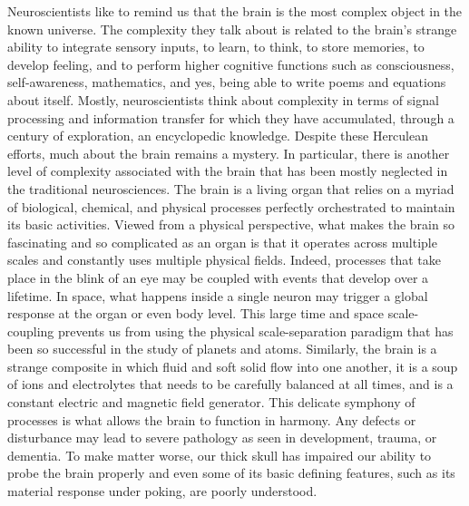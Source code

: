 %
%

\foreword

\setcounter{page}{7}




Neuroscientists like to remind us that the brain is the most complex
object in the known universe. The complexity they talk about is
related to the brain's strange ability to integrate sensory inputs, to
learn, to think, to store memories, to develop feeling, and to perform
higher cognitive functions such as consciousness, self-awareness,
mathematics, and yes, being able to write poems and equations about
itself. Mostly, neuroscientists think about complexity in terms of
signal processing and information transfer for which they have
accumulated, through a century of exploration, an encyclopedic
knowledge. Despite these Herculean efforts, much about the brain
remains a mystery. In particular, there is another level of complexity
associated with the brain that has been mostly neglected in the
traditional neurosciences. The brain is a living organ that relies on
a myriad of biological, chemical, and physical processes perfectly
orchestrated to maintain its basic activities. Viewed from a physical
perspective, what makes the brain so fascinating and so complicated as
an organ is that it operates across multiple scales and constantly
uses multiple physical fields. Indeed, processes that take place in
the blink of an eye may be coupled with events that develop over a
lifetime. In space, what happens inside a single neuron may trigger a
global response at the organ or even body level. This large time and
space scale-coupling prevents us from using the physical
scale-separation paradigm that has been so successful in the study of
planets and atoms. Similarly, the brain is a strange composite in
which fluid and soft solid flow into one another, it is a soup of ions
and electrolytes that needs to be carefully balanced at all times, and
is a constant electric and magnetic field generator. This delicate
symphony of processes is what allows the brain to function in
harmony. Any defects or disturbance may lead to severe pathology as
seen in development, trauma, or dementia. To make matter worse, our
thick skull has impaired our ability to probe the brain properly and
even some of its basic defining features, such as its material
response under poking, are poorly understood.

